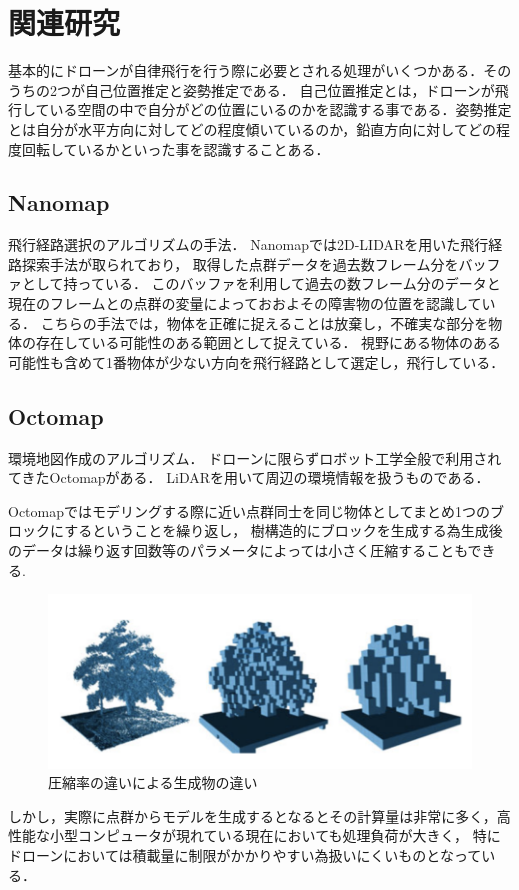 \chapter{関連研究}
\label{related_works}

基本的にドローンが自律飛行を行う際に必要とされる処理がいくつかある．そのうちの2つが自己位置推定と姿勢推定である．
自己位置推定とは，ドローンが飛行している空間の中で自分がどの位置にいるのかを認識する事である．姿勢推定とは自分が水平方向に対してどの程度傾いているのか，鉛直方向に対してどの程度回転しているかといった事を認識することある．

\section{Nanomap}
飛行経路選択のアルゴリズムの手法．
Nanomap\cite{Nanomap}では2D-LIDARを用いた飛行経路探索手法が取られており， 取得した点群データを過去数フレーム分をバッファとして持っている．
このバッファを利用して過去の数フレーム分のデータと現在のフレームとの点群の変量によっておおよその障害物の位置を認識している．
こちらの手法では，物体を正確に捉えることは放棄し，不確実な部分を物体の存在している可能性のある範囲として捉えている．
視野にある物体のある可能性も含めて1番物体が少ない方向を飛行経路として選定し，飛行している．

\section{Octomap}
環境地図作成のアルゴリズム．
ドローンに限らずロボット工学全般で利用されてきたOctomap\cite{Octomap}がある．
LiDARを用いて周辺の環境情報を扱うものである．

Octomapではモデリングする際に近い点群同士を同じ物体としてまとめ1つのブロックにするということを繰り返し，
樹構造的にブロックを生成する為生成後のデータは繰り返す回数等のパラメータによっては小さく圧縮することもできる.
\begin{figure}[htbp]
  \begin{center}
    \includegraphics[clip,width=15.0cm]{img/octomap.png}
    \caption{圧縮率の違いによる生成物の違い}
    \label{fig:hamu}
  \end{center}
\end{figure}
しかし，実際に点群からモデルを生成するとなるとその計算量は非常に多く，高性能な小型コンピュータが現れている現在においても処理負荷が大きく，
特にドローンにおいては積載量に制限がかかりやすい為扱いにくいものとなっている．


